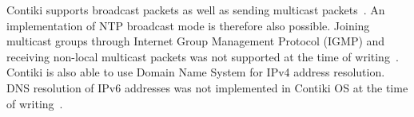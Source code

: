 Contiki supports broadcast packets as well as sending multicast packets~\cite{contiki-docs}.
An implementation of NTP broadcast mode is therefore also possible.
Joining multicast groups through Internet Group Management Protocol (IGMP)
and receiving non-local multicast packets
was not supported at the time of writing~\cite{contiki-docs}.
Contiki is also able to use Domain Name System for IPv4 address resolution.
DNS resolution of IPv6 addresses was not implemented in Contiki OS
at the time of writing~\cite{contiki-docs}.
